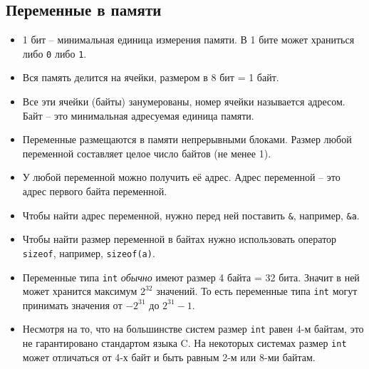\documentclass[10pt]{article}
\begin{document}
\subsection*{Переменные в памяти}
\begin{itemize}
\item 1 бит -- минимальная единица измерения памяти. В 1 бите может храниться либо \texttt{0} либо \texttt{1}.
\item Вся память делится на ячейки, размером в 8 бит = 1 байт.
\item Все эти ячейки (байты) занумерованы, номер ячейки называется адресом. Байт -- это минимальная адресуемая единица памяти.
\item Переменные размещаются в памяти непрерывными блоками. Размер любой переменной составляет целое число байтов (не менее 1).
\item У любой переменной можно получить её адрес. Адрес переменной -- это адрес первого байта переменной.
\item Чтобы найти адрес переменной, нужно перед ней поставить \texttt{\&}, например, \texttt{\&a}.
\item Чтобы найти размер переменной в байтах нужно использовать оператор \texttt{sizeof}, например,  \texttt{sizeof(a)}.
\item Переменные типа \texttt{int} \textit{обычно} имеют размер 4 байта = 32 бита. Значит в ней может хранится максимум $2^{32}$ значений. То есть переменные типа \texttt{int} могут принимать значения от $-2^{31}$ до $2^{31} - 1$.
\item Несмотря на то, что на большинстве систем размер \texttt{int} равен 4-м байтам, это не гарантировано стандартом языка C. На некоторых системах размер \texttt{int} может отличаться от 4-х байт и быть равным 2-м или 8-ми байтам.
\end{itemize}
\end{document}
